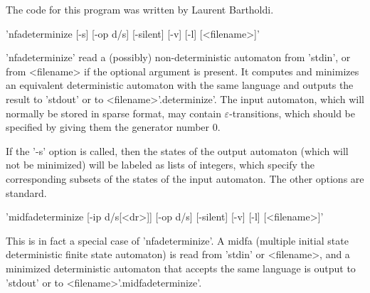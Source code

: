 The code for this program was written by Laurent Bartholdi.

'nfadeterminize [-s] [-op d/s] [-silent] [-v] [-l] [<filename>]'

'nfadeterminize' read a (possibly) non-deterministic automaton from
'stdin', or from <filename> if the optional argument is present.
It computes and minimizes an equivalent deterministic
automaton with the same language and outputs the result to 'stdout'
or to <filename>'.determinize'. The input automaton, which will
normally be stored in sparse format, may contain $\varepsilon$-transitions,
which should be specified by giving them the generator number 0.

If the '-s' option is called, then the states of the output automaton
(which will not be minimized) will be labeled as lists of integers, which
specify the corresponding subsets of the states of the input automaton.
The other options are standard.


'midfadeterminize [-ip d/s[<dr>]] [-op d/s] [-silent] [-v] [-l] [<filename>]'

This is in fact a special case of 'nfadeterminize'.
A midfa (multiple initial state deterministic finite state automaton) is read
from 'stdin' or <filename>, and a minimized deterministic automaton that
accepts the same language is output to 'stdout' or to
<filename>'.midfadeterminize'.
